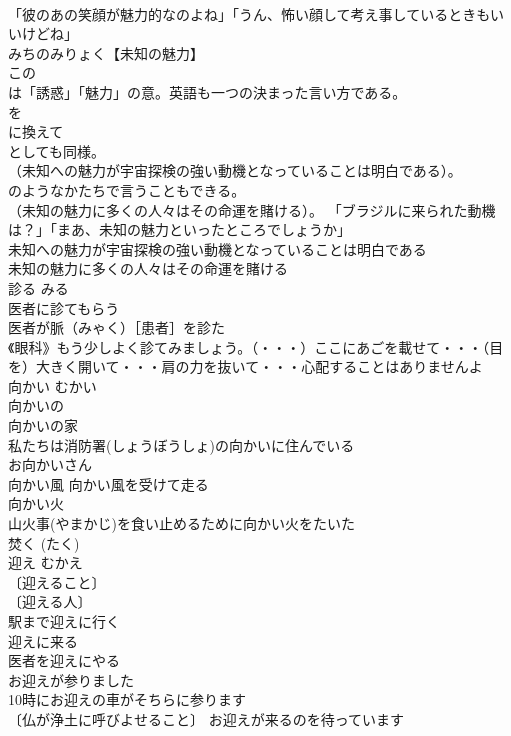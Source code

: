 \documentclass[8pt]{extreport}
\begin{document}
\begin{CJK}{UTF8}{min}
\\	「彼のあの笑顔が魅力的なのよね」「うん、怖い顔して考え事しているときもいいけどね」 
\\	みちのみりょく【未知の魅力】 
\\	この
\\	は「誘惑」「魅力」の意。英語も一つの決まった言い方である。
\\	を
\\	に換えて
\\	としても同様。
\\	（未知への魅力が宇宙探検の強い動機となっていることは明白である）。
\\	のようなかたちで言うこともできる。
\\	（未知の魅力に多くの人々はその命運を賭ける）。 「ブラジルに来られた動機は？」「まあ、未知の魅力といったところでしょうか」 
\\	未知への魅力が宇宙探検の強い動機となっていることは明白である 
\\	未知の魅力に多くの人々はその命運を賭ける 
\\	診る	みる	
\\	医者に診てもらう 
\\	医者が脈（みゃく）［患者］を診た 
\\	《眼科》もう少しよく診てみましょう。（・・・）ここにあごを載せて・・・（目を）大きく開いて・・・肩の力を抜いて・・・心配することはありませんよ 
\\	向かい	むかい	
\\	向かいの 
\\	向かいの家 
\\	私たちは消防署(しょうぼうしょ)の向かいに住んでいる 
\\	お向かいさん 
\\	向かい風 向かい風を受けて走る 
\\	向かい火 
\\	山火事(やまかじ)を食い止めるために向かい火をたいた 
\\	焚く (たく) 
\\	迎え	むかえ	
\\	〔迎えること〕
\\	〔迎える人〕
\\	駅まで迎えに行く 
\\	迎えに来る 
\\	医者を迎えにやる 
\\	お迎えが参りました 
\\	10時にお迎えの車がそちらに参ります 
\\	〔仏が浄土に呼びよせること〕 お迎えが来るのを待っています 

\end{CJK}
\end{document}
